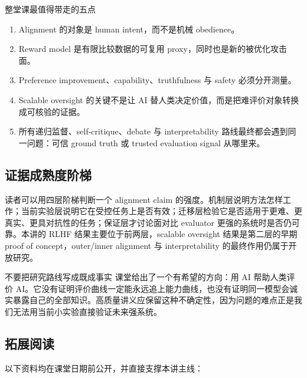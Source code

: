 \documentclass[a4paper]{article}
\begin{document}
\begin{importantbox}{整堂课最值得带走的五点}
\begin{enumerate}
  \item Alignment 的对象是 human intent，而不是机械 obedience。
  \item Reward model 是有限比较数据的可复用 proxy，同时也是新的被优化攻击面。
  \item Preference improvement、capability、truthfulness 与 safety 必须分开测量。
  \item Scalable oversight 的关键不是让 AI 替人类决定价值，而是把难评价对象转换成可核验的证据。
  \item 所有递归监督、self-critique、debate 与 interpretability 路线最终都会遇到同一问题：可信 ground truth 或 trusted evaluation signal 从哪里来。
\end{enumerate}
\end{importantbox}

\subsection{证据成熟度阶梯}

读者可以用四层阶梯判断一个 alignment claim 的强度。机制层说明方法怎样工作；当前实验层说明它在受控任务上是否有效；迁移层检验它是否适用于更难、更真实、更具对抗性的任务；保证层才讨论面对比 evaluator 更强的系统时是否仍可靠。本讲的 RLHF 结果主要位于前两层，scalable oversight 结果是第二层的早期 proof of concept，outer/inner alignment 与 interpretability 的最终作用仍属于开放研究。

\begin{warningbox}{不要把研究路线写成既成事实}
课堂给出了一个有希望的方向：用 AI 帮助人类评价 AI。它没有证明评价曲线一定能永远追上能力曲线，也没有证明同一模型会诚实暴露自己的全部知识。高质量讲义应保留这种不确定性，因为问题的难点正是我们无法用当前小实验直接验证未来强系统。
\end{warningbox}

\subsection{拓展阅读}

以下资料均在课堂日期前公开，并直接支撑本讲主线：
\end{document}
